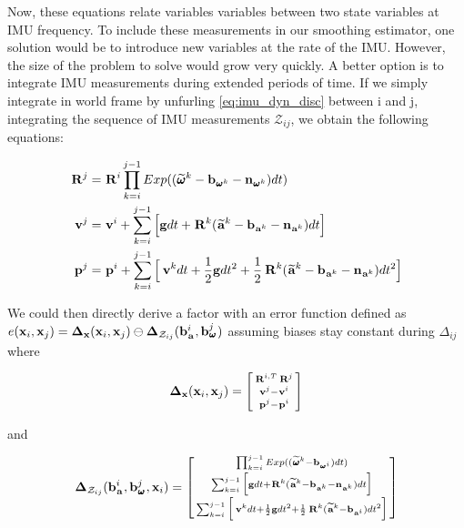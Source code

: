 Now, these equations relate variables variables between two state variables at IMU frequency. To include these measurements in our smoothing estimator,
one solution would be to introduce new variables at the rate of the IMU. However, the size of the problem to solve would grow very quickly. A better option
is to integrate IMU measurements during extended periods of time. If we simply integrate in world frame by unfurling \ref{eq:imu_dyn_disc} between i and j, integrating
the sequence of IMU measurements $\mathcal{Z}_{ij}$, we obtain
the following equations:

\begin{equation}
    \begin{split}
    \prescript{}{}{{\bf R}}_{}^{j}  &= \prescript{}{}{{\bf R}}_{}^{i} \prod_{k=i}^{j-1} Exp((\prescript{}{}{\widetilde{\pmb{\omega}}}_{}^k - {\bf b}_{\prescript{}{}{\pmb{\omega}}_{}^k} - {\bf n}_{\prescript{}{}{\pmb{\omega}}_{}^k})dt) \\
    \prescript{}{}{{\bf v}}_{}^{j}  &= \prescript{}{}{{\bf v}}_{}^{i} + \sum_{k=i}^{j-1} \Big[{\bf g} dt + \prescript{}{}{{\bf R}}_{}^{k}(\prescript{}{}{\widetilde{{\bf a}}}_{}^k - {\bf b}_{\prescript{}{}{{\bf a}}_{}^k} - {\bf n}_{\prescript{}{}{{\bf a}}_{}^k})dt \Big]  \\
    \prescript{}{}{{\bf p}}_{}^{j} &= \prescript{}{}{{\bf p}}_{}^{i} + \sum_{k=i}^{j-1} \Big[\prescript{}{}{{\bf v}}_{}^{k}dt + \frac{1}{2}{\bf g} dt^2 
    + \frac{1}{2}\prescript{}{}{{\bf R}}_{}^{k}(\prescript{}{}{\widetilde{{\bf a}}}_{}^k - {\bf b}_{\prescript{}{}{{\bf a}}_{}^k} - {\bf n}_{\prescript{}{}{{\bf a}}_{}^k})dt^2 \Big]
    \end{split}
    \label{eq:IMUIntij}
\end{equation}

We could then directly derive a factor with an error function defined as
$e({\bf x}_i, {\bf x}_j) = {\bm \Delta}_{{\bf x}}({\bf x}_i, {\bf x}_j)  \ominus  {\bm \Delta}_{\mathcal{Z}_{ij}}({\bf b}_{\prescript{}{}{{\bf a}}_{}}^i, {\bf b}_{\prescript{}{}{\pmb{\omega}}_{}}^j)$
assuming biases stay constant during $\Delta_{ij}$  where 

\begin{align}
    {\bm \Delta}_{{\bf x}}({\bf x}_i, {\bf x}_j) = 
    \begin{bsmallmatrix}
    \prescript{}{}{{\bf R}}_{}^{i,T} \prescript{}{}{{\bf R}}_{}^{j}  \\
    \prescript{}{}{{\bf v}}_{}^{j}  - \prescript{}{}{{\bf v}}_{}^{i}  \\
    \prescript{}{}{{\bf p}}_{}^{j} - \prescript{}{}{{\bf p}}_{}^{i}
    \end{bsmallmatrix}
\end{align}

and 

\begin{align}
    {\bm \Delta}_{\mathcal{Z}_{ij}}({\bf b}_{\prescript{}{}{{\bf a}}_{}}^i, {\bf b}_{\prescript{}{}{\pmb{\omega}}_{}}^j, {\bf x}_i) = 
    \begin{bsmallmatrix}
    \prod_{k=i}^{j-1} Exp((\prescript{}{}{\widetilde{\pmb{\omega}}}_{}^k - {\bf b}_{\prescript{}{}{\pmb{\omega}}_{}^i})dt)  \\
    \sum_{k=i}^{j-1} \Big[{\bf g} dt + \prescript{}{}{{\bf R}}_{}^{k}(\prescript{}{}{\widetilde{{\bf a}}}_{}^k - {\bf b}_{\prescript{}{}{{\bf a}}_{}^k} - {\bf n}_{\prescript{}{}{{\bf a}}_{}^k})dt \Big]  \\
    \sum_{k=i}^{j-1} \Big[\prescript{}{}{{\bf v}}_{}^{k}dt + \frac{1}{2}{\bf g} dt^2 
    + \frac{1}{2}\prescript{}{}{{\bf R}}_{}^{k}(\prescript{}{}{\widetilde{{\bf a}}}_{}^k - {\bf b}_{\prescript{}{}{{\bf a}}_{}^i})dt^2 \Big]
    \end{bsmallmatrix}
\end{align}

